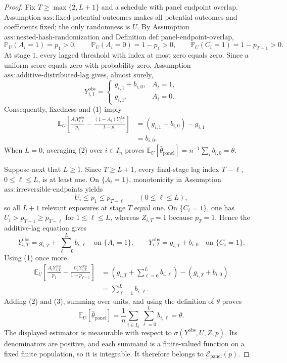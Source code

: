 \documentclass{article}
\begin{document}
\begin{proof}
Fix \(T\geq\max\{2,L+1\}\) and a schedule with panel endpoint overlap.  Assumption \(\mathrm{ass:fixed\text{-}potential\text{-}outcomes}\) makes all potential outcomes and coefficients fixed; the only randomness is \(U\).  By Assumption \(\mathrm{ass:nested\text{-}hash\text{-}randomization}\) and Definition \(\mathrm{def:panel\text{-}endpoint\text{-}overlap}\),
\[
 \mathbb P_U(A_i=1)=p_1>0,
 \qquad
 \mathbb P_U(A_i=0)=1-p_1>0,
 \qquad
 \mathbb P_U(C_i=1)=1-p_{T-1}>0.
 \tag{1}
\]
At stage \(1\), every lagged threshold with index at most zero equals zero.  Since a uniform score equals zero with probability zero, Assumption \(\mathrm{ass:additive\text{-}distributed\text{-}lag}\) gives, almost surely,
\[
 Y^{\mathrm{obs}}_{i,1}
 =\begin{cases}
 g_{i,1}+b_{i,0},&A_i=1,\\
 g_{i,1},&A_i=0.
 \end{cases}
\]
Consequently, fixedness and (1) imply
\[
\begin{aligned}
 \mathbb E_U\!\left[
 \frac{A_iY^{\mathrm{obs}}_{i,1}}{p_1}
 -\frac{(1-A_i)Y^{\mathrm{obs}}_{i,1}}{1-p_1}
 \right]
 &=(g_{i,1}+b_{i,0})-g_{i,1}\\
 &=b_{i,0}.
\end{aligned}
\tag{2}
\]
When \(L=0\), averaging (2) over \(i\in I_n\) proves \(\mathbb E_U[\widehat\theta_{\mathrm{panel}}]=n^{-1}\sum_i b_{i,0}=\theta\).

Suppose next that \(L\geq1\).  Since \(T\geq L+1\), every final-stage lag index \(T-\ell\), \(0\leq\ell\leq L\), is at least one.  On \(\{A_i=1\}\), monotonicity in Assumption \(\mathrm{ass:irreversible\text{-}endpoints}\) yields
\[
 U_i\leq p_1\leq p_{T-\ell}
 \qquad(0\leq\ell\leq L),
\]
so all \(L+1\) relevant exposures at stage \(T\) equal one.  On \(\{C_i=1\}\), one has \(U_i>p_{T-1}\geq p_{T-\ell}\) for \(1\leq\ell\leq L\), whereas \(Z_{i,T}=1\) because \(p_T=1\).  Hence the additive-lag equation gives
\[
 Y^{\mathrm{obs}}_{i,T}
 =g_{i,T}+\sum_{\ell=0}^{L}b_{i,\ell}
 \quad\text{on }\{A_i=1\},
 \qquad
 Y^{\mathrm{obs}}_{i,T}=g_{i,T}+b_{i,0}
 \quad\text{on }\{C_i=1\}.
\]
Using (1) once more,
\[
\begin{aligned}
 \mathbb E_U\!\left[
 \frac{A_iY^{\mathrm{obs}}_{i,T}}{p_1}
 -\frac{C_iY^{\mathrm{obs}}_{i,T}}{1-p_{T-1}}
 \right]
 &=\left(g_{i,T}+\sum_{\ell=0}^{L}b_{i,\ell}\right)
   -(g_{i,T}+b_{i,0})\\
 &=\sum_{\ell=1}^{L}b_{i,\ell}.
\end{aligned}
\tag{3}
\]
Adding (2) and (3), summing over units, and using the definition of \(\theta\) proves
\[
 \mathbb E_U[\widehat\theta_{\mathrm{panel}}]
 =\frac1n\sum_{i\in I_n}\sum_{\ell=0}^{L}b_{i,\ell}
 =\theta.
\]
The displayed estimator is measurable with respect to \(\sigma(Y^{\mathrm{obs}},U,Z,p)\).  Its denominators are positive, and each summand is a finite-valued function on a fixed finite population, so it is integrable.  It therefore belongs to \(\mathcal E_{\mathrm{panel}}(p)\).


\end{proof}
\end{document}
